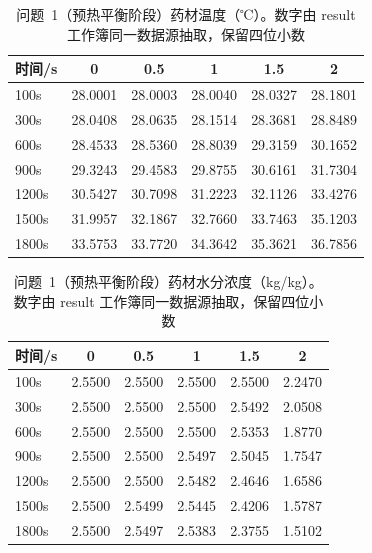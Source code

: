 
\begin{table}[htbp]
\centering
\caption{问题~1（预热平衡阶段）药材温度（℃）。数字由 result 工作簿同一数据源抽取，保留四位小数}
\label{tab:表1}
\small
\begin{tabular}{lccccc}
\toprule
时间/s & 0 & 0.5 & 1 & 1.5 & 2 \\
\midrule
100s & 28.0001 & 28.0003 & 28.0040 & 28.0327 & 28.1801 \\
300s & 28.0408 & 28.0635 & 28.1514 & 28.3681 & 28.8489 \\
600s & 28.4533 & 28.5360 & 28.8039 & 29.3159 & 30.1652 \\
900s & 29.3243 & 29.4583 & 29.8755 & 30.6161 & 31.7304 \\
1200s & 30.5427 & 30.7098 & 31.2223 & 32.1126 & 33.4276 \\
1500s & 31.9957 & 32.1867 & 32.7660 & 33.7463 & 35.1203 \\
1800s & 33.5753 & 33.7720 & 34.3642 & 35.3621 & 36.7856 \\
\bottomrule
\end{tabular}
\end{table}

\begin{table}[htbp]
\centering
\caption{问题~1（预热平衡阶段）药材水分浓度（kg/kg）。数字由 result 工作簿同一数据源抽取，保留四位小数}
\label{tab:表2}
\small
\begin{tabular}{lccccc}
\toprule
时间/s & 0 & 0.5 & 1 & 1.5 & 2 \\
\midrule
100s & 2.5500 & 2.5500 & 2.5500 & 2.5500 & 2.2470 \\
300s & 2.5500 & 2.5500 & 2.5500 & 2.5492 & 2.0508 \\
600s & 2.5500 & 2.5500 & 2.5500 & 2.5353 & 1.8770 \\
900s & 2.5500 & 2.5500 & 2.5497 & 2.5045 & 1.7547 \\
1200s & 2.5500 & 2.5500 & 2.5482 & 2.4646 & 1.6586 \\
1500s & 2.5500 & 2.5499 & 2.5445 & 2.4206 & 1.5787 \\
1800s & 2.5500 & 2.5497 & 2.5383 & 2.3755 & 1.5102 \\
\bottomrule
\end{tabular}
\end{table}

